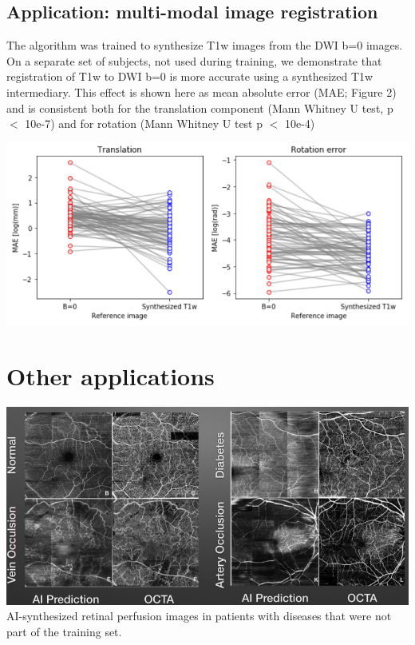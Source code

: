 \documentclass[a0, landscape]{a0poster}
\begin{document}
\begin{multicols}{3}
\subsection*{Application: multi-modal image registration}

The algorithm was trained to synthesize T1w images from the DWI b=0 images. On a separate set of subjects, not used during training, we demonstrate that registration of T1w to DWI b=0 is more accurate using a synthesized T1w intermediary. This effect is shown here as mean absolute error (MAE; Figure 2) and is consistent both for the translation component (Mann Whitney U test, p $<$ 10e-7) and for rotation (Mann Whitney U test p $<$ 10e-4)

\begin{minipage}[t]{1.0\linewidth}
    \includegraphics[width=0.8\linewidth]{motion_correction.png}
\end{minipage}

\section*{Other applications}

\begin{minipage}[t]{1\linewidth}
\includegraphics[width=0.7\linewidth]{octa.png}
\\
AI-synthesized retinal perfusion images in patients with diseases that were not part of the training set.
\end{minipage}

\color{SaddleBrown} %


\end{multicols}
\end{document}
